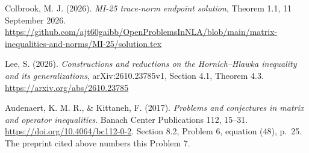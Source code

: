 \documentclass[11pt,a4paper]{article}
\begin{document}
Colbrook, M. J. (2026). \emph{MI-25 trace-norm endpoint solution}, Theorem 1.1, 11 September 2026. \url{https://github.com/ajt60gaibb/OpenProblemsInNLA/blob/main/matrix-inequalities-and-norms/MI-25/solution.tex}

Lee, S. (2026). \emph{Constructions and reductions on the Hornich--Hlawka inequality and its generalizations}, arXiv:2610.23785v1, Section 4.1, Theorem 4.3. \url{https://arxiv.org/abs/2610.23785}

Audenaert, K. M. R., \& Kittaneh, F. (2017). \emph{Problems and conjectures in matrix and operator inequalities}. Banach Center Publications 112, 15--31. \url{https://doi.org/10.4064/bc112-0-2}. Section 8.2, Problem 6, equation (48), p.~25. The preprint cited above numbers this Problem 7.
\end{document}

